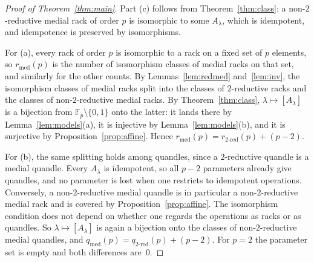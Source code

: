 \documentclass[11pt]{article}
\theoremstyle{definition}
\theoremstyle{remark}
\newcommand{\F}{\mathbb F}
\newcommand{\rmed}{r_{\mathrm{med}}}
\newcommand{\rred}{r_{\mathrm{2\text{-}red}}}
\newcommand{\qmed}{q_{\mathrm{med}}}
\newcommand{\qred}{q_{\mathrm{2\text{-}red}}}
\begin{document}
\begin{proof}[Proof of Theorem~\ref{thm:main}]
Part (c) follows from Theorem~\ref{thm:class}: a non-$2$-reductive medial rack
of order $p$ is isomorphic to some $A_\lambda$, which is idempotent, and
idempotence is preserved by isomorphisms.

For (a), every rack of order $p$ is isomorphic to a rack on a fixed set of $p$
elements, so $\rmed(p)$ is the number of isomorphism classes of medial racks on
that set, and similarly for the other counts. By Lemmas~\ref{lem:redmed}
and~\ref{lem:inv}, the isomorphism classes of medial racks split into the
classes of $2$-reductive racks and the classes of non-$2$-reductive medial
racks. By Theorem~\ref{thm:class}, $\lambda\mapsto[A_\lambda]$ is a bijection
from $\F_p\setminus\{0,1\}$ onto the latter: it lands there by
Lemma~\ref{lem:models}(a), it is injective by Lemma~\ref{lem:models}(b), and
it is surjective by Proposition~\ref{prop:affine}. Hence
$\rmed(p)=\rred(p)+(p-2)$.

For (b), the same splitting holds among quandles, since a $2$-reductive
quandle is a medial quandle. Every $A_\lambda$ is idempotent, so all $p-2$
parameters already give quandles, and no parameter is lost when one restricts
to idempotent operations. Conversely, a non-$2$-reductive medial quandle is in
particular a non-$2$-reductive medial rack and is covered by
Proposition~\ref{prop:affine}. The isomorphism condition does not depend on
whether one regards the operations as racks or as quandles. So
$\lambda\mapsto[A_\lambda]$ is again a bijection onto the classes of
non-$2$-reductive medial quandles, and $\qmed(p)=\qred(p)+(p-2)$. For $p=2$
the parameter set is empty and both differences are~$0$.
\end{proof}
\end{document}
